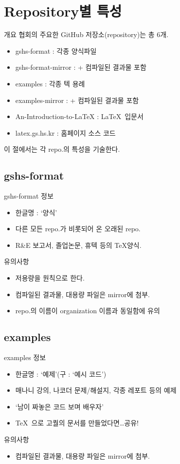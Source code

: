 \documentclass[12pt]{beamer}
\begin{document}
\section{Repository별 특성}
\begin{frame}{개요}
	협회의 주요한 GitHub 저장소(repository)는 총 6개.
	\begin{itemize}
		\item gshs-format : 각종 양식파일
		\item gshs-format-mirror : + 컴파일된 결과물 포함
		\item examples : 각종 텍 용례
		\item examples-mirror : + 컴파일된 결과물 포함
		\item An-Introduction-to-LaTeX : \LaTeX\ 입문서
		\item latex.gs.hs.kr : 홈페이지 소스 코드
	\end{itemize}
	이 절에서는 각 repo.의 특성을 기술한다.
\end{frame}
\subsection{gshs-format}
\begin{frame}{gshs-format}
	정보
	\begin{itemize}
		\item 한글명 : `양식'
		\item 다른 모든 repo.가 비롯되어 온 오래된 repo.
		\item R\&E 보고서, 졸업논문, 휴텍 등의 \TeX 양식.
	\end{itemize}
	\vfill
	유의사항
	\begin{itemize}
		\item 저용량을 원칙으로 한다.
		\item 컴파일된 결과물, 대용량 파일은 mirror에 첨부.
		\item repo.의 이름이 organization 이름과 동일함에 유의
	\end{itemize}
	\vfill
\end{frame}
\subsection{examples}
\begin{frame}{examples}
	정보
	\begin{itemize}
		\item 한글명 : `예제'(구 : `예시 코드')
		\item 매나니 강의, 나코더 문제/해설지, 각종 레포트 등의 예제
		\item `남이 짜놓은 코드 보며 배우자'
		\item \TeX\ 으로 고퀄의 문서를 만들었다면\ldots 공유!
	\end{itemize}
	\vfill
	유의사항
	\begin{itemize}
		\item 컴파일된 결과물, 대용량 파일은 mirror에 첨부.
	\end{itemize}
	\vfill
\end{frame}
\end{document}
